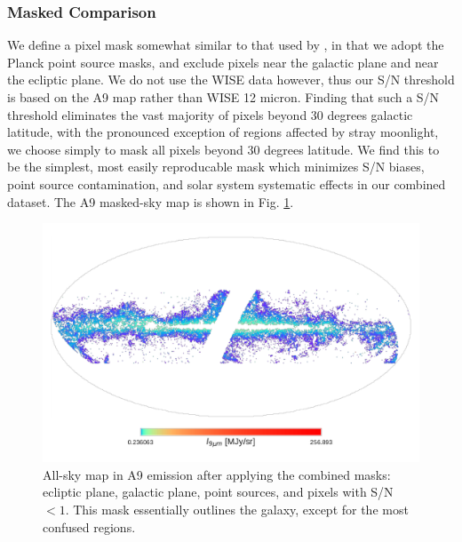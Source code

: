     \subsubsection{Masked Comparison}
        We define a pixel mask somewhat similar to that used by \cite{hensley16}, in that we adopt the Planck point source masks, and exclude pixels near the galactic plane and near the ecliptic plane. We do not use the WISE data however, thus our S/N threshold is based on the A9 map rather than WISE 12 micron. Finding that such a S/N threshold eliminates the vast majority of pixels beyond 30 degrees galactic latitude, with the pronounced exception of regions affected by stray moonlight, we choose simply to mask all pixels beyond 30 degrees latitude. We find this to be the simplest, most easily reproducable mask which minimizes S/N biases, point source contamination, and solar system systematic effects in our combined dataset. The A9 masked-sky map is shown in Fig. \ref{fig:A9_masked_map}.
        \begin{figure}
          \includegraphics[width=\textwidth]{../Plots/ch_allsky/masked_map_A9.pdf}
          \centering
          \caption{All-sky map in A9 emission after applying the combined masks: ecliptic plane, galactic plane, point sources, and pixels with S/N $<1$. This mask essentially outlines the galaxy, except for the most confused regions.}
          \label{fig:A9_masked_map}
        \end{figure}

